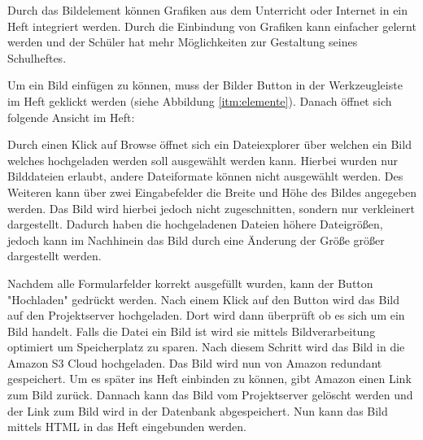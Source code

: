 
Durch das Bildelement können Grafiken aus dem Unterricht oder Internet in ein Heft integriert werden. Durch die Einbindung von Grafiken kann einfacher gelernt werden und der Schüler hat mehr Möglichkeiten zur Gestaltung seines Schulheftes.

Um ein Bild einfügen zu können, muss der Bilder Button in der Werkzeugleiste im Heft geklickt werden (siehe Abbildung \ref{itm:elemente}). Danach öffnet sich folgende Ansicht im Heft:


Durch einen Klick auf Browse öffnet sich ein Dateiexplorer über welchen ein Bild welches hochgeladen werden soll ausgewählt werden kann. Hierbei wurden nur Bilddateien erlaubt, andere Dateiformate können nicht ausgewählt werden. Des Weiteren kann über zwei Eingabefelder die Breite und Höhe des Bildes angegeben werden. Das Bild wird hierbei jedoch nicht zugeschnitten, sondern nur verkleinert dargestellt. Dadurch haben die hochgeladenen Dateien höhere Dateigrößen, jedoch kann im Nachhinein das Bild durch eine Änderung der Größe größer dargestellt werden. 

Nachdem alle Formularfelder korrekt ausgefüllt wurden, kann der Button "Hochladen" gedrückt werden. Nach einem Klick auf den Button wird das Bild auf den Projektserver hochgeladen. Dort wird dann überprüft ob es sich um ein Bild handelt. Falls die Datei ein Bild ist wird sie mittels Bildverarbeitung optimiert um Speicherplatz zu sparen. Nach diesem Schritt wird das Bild in die Amazon S3 Cloud hochgeladen. Das Bild wird nun von Amazon redundant gespeichert. Um es später ins Heft einbinden zu können, gibt Amazon einen Link zum Bild zurück. Dannach kann das Bild vom Projektserver gelöscht werden und der Link zum Bild wird in der Datenbank abgespeichert. Nun kann das Bild mittels HTML in das Heft eingebunden werden. 